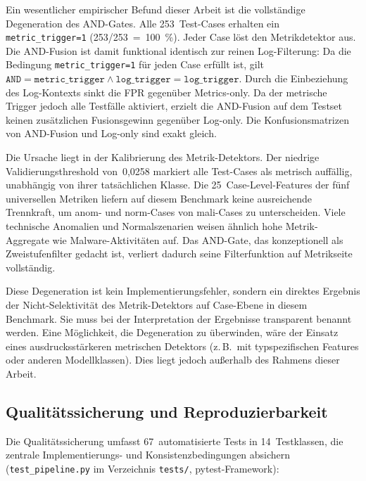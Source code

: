 Ein wesentlicher empirischer Befund dieser Arbeit ist die vollständige Degeneration des AND-Gates. Alle 253~Test-Cases erhalten ein \texttt{metric\_trigger=1} (253/253~=~100~\%). Jeder Case löst den Metrikdetektor aus. Die AND-Fusion ist damit funktional identisch zur reinen Log-Filterung: Da die Bedingung \texttt{metric\_trigger=1} für jeden Case erfüllt ist, gilt $\texttt{AND} = \texttt{metric\_trigger} \wedge \texttt{log\_trigger} = \texttt{log\_trigger}$. Durch die Einbeziehung des Log-Kontexts sinkt die FPR gegenüber Metrics-only. Da der metrische Trigger jedoch alle Testfälle aktiviert, erzielt die AND-Fusion auf dem Testset keinen zusätzlichen Fusionsgewinn gegenüber Log-only. Die Konfusionsmatrizen von AND-Fusion und Log-only sind exakt gleich.

Die Ursache liegt in der Kalibrierung des Metrik-Detektors. Der niedrige Validierungsthreshold von~0{,}0258 markiert alle Test-Cases als metrisch auffällig, unabhängig von ihrer tatsächlichen Klasse. Die 25~Case-Level-Features der fünf universellen Metriken liefern auf diesem Benchmark keine ausreichende Trennkraft, um anom- und norm-Cases von mali-Cases zu unterscheiden. Viele technische Anomalien und Normalszenarien weisen ähnlich hohe Metrik-Aggregate wie Malware-Aktivitäten auf. Das AND-Gate, das konzeptionell als Zweistufenfilter gedacht ist, verliert dadurch seine Filterfunktion auf Metrikseite vollständig.

Diese Degeneration ist kein Implementierungsfehler, sondern ein direktes Ergebnis der Nicht-Selektivität des Metrik-Detektors auf Case-Ebene in diesem Benchmark. Sie muss bei der Interpretation der Ergebnisse transparent benannt werden. Eine Möglichkeit, die Degeneration zu überwinden, wäre der Einsatz eines ausdrucksstärkeren metrischen Detektors (z.\,B.\ mit typspezifischen Features oder anderen Modellklassen). Dies liegt jedoch außerhalb des Rahmens dieser Arbeit.

\subsection{Qualitätssicherung und Reproduzierbarkeit}

Die Qualitätssicherung umfasst 67~automatisierte Tests in 14~Testklassen, die zentrale Implementierungs- und Konsistenzbedingungen absichern (\texttt{test\_pipeline.py} im Verzeichnis \texttt{tests/}, pytest-Framework):

